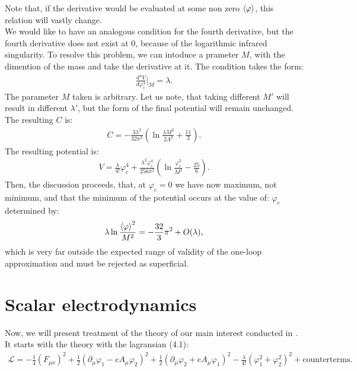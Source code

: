 Note that, if the derivative would be evaluated at some non zero ${\langle\varphi\rangle}$, this relation will 
vastly change. \\
We would like to have an analogous condition for the fourth derivative, but
 the fourth derivative does not exist at 0, because of the logarithmic infrared singularity.
To resolve this problem, we can intoduce a prameter $M$, with the dimention of the mass and take 
the derivative at it.
The condition takes the form:
\begin{align}
\frac{d^4V}{d\varphi_c^4}\Big|_M=\lambda.
\end{align}
The parameter $M$ taken is arbitrary. Let us note, that taking different $M'$ will result 
in different $\lambda'$, but the form of the final potential will remain unchanged.\\
The resulting $C$ is:
\begin{align}
C=-\frac{3\lambda^2}{32\pi^2}\left(\ln\frac{\lambda M^2}{2\Lambda^2}+\frac{11}{3}\right).
\end{align}
The resulting potential is:
\begin{align}
V=\frac{\lambda}{4!}\varphi_c^4+\frac{\lambda^2\varphi_c^4}{256\pi^2}\left(\ln
\frac{\varphi_c^2}{M^2}-\frac{25}{6}\right).
\end{align}
Then, the discussion proceeds, that, at $\varphi_c = 0$ we have now maximum, not minimum, 
and that the minimum of the potential occurs at the value of: 
$\varphi_c$ determined by:
\begin{align}
\lambda\ln\frac{{\langle\varphi\rangle}^2}{M^2}=-\frac{32}{3}\pi^2+O(\lambda),
\end{align}
which is very far outside the expected range of validity of the one-loop approximation and must be 
rejected as superficial. \\
\section{Scalar electrodynamics}
Now, we will present treatment of the theory of our main interest conducted in 
\cite{Coleman1973}. \\
It starts with the theory with the lagransian \cite{Coleman1973}(4.1):
\begin{align}\label{CW_electrodynamics}
\mathcal{L} = -\frac{1}{4}(F_{\mu\nu})^2+\frac{1}{2}(\partial_\mu\varphi_1-eA_\mu\varphi_2)^2 + 
\frac{1}{2}(\partial_\mu\varphi_2+eA_\mu\varphi_1)^2-\frac{\lambda}{4!}(\varphi_1^2+\varphi_2^2)^2 
 + \textrm{counterterms}.
\end{align}

